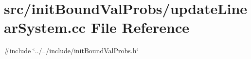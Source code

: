 \section{src/init\+Bound\+Val\+Probs/update\+Linear\+System.cc File Reference}
\label{update_linear_system_8cc}
{\ttfamily \#include \char`\"{}../../include/init\+Bound\+Val\+Probs.\+h\char`\"{}}\newline
